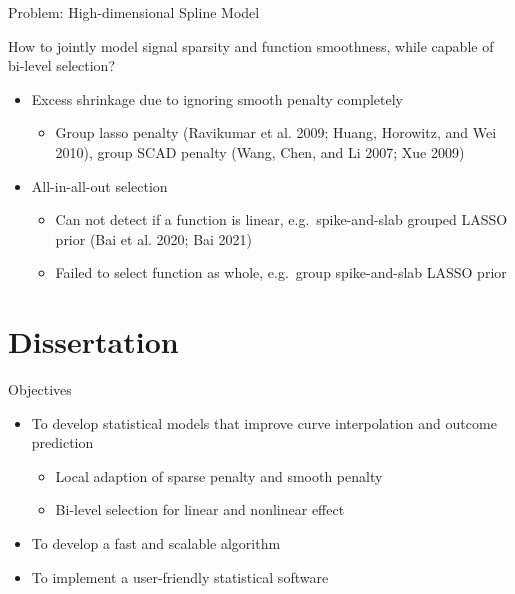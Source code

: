 \documentclass[
  ignorenonframetext,
  aspectratio=169]{beamer}
\providecommand{\tightlist}{%
  \setlength{\itemsep}{0pt}\setlength{\parskip}{0pt}}
\begin{document}
\begin{frame}{Problem: High-dimensional Spline Model}
\protect\hypertarget{problem-high-dimensional-spline-model}{}
\begin{tcolorbox}[colback=green!5,colframe=green!40!black,title=Question]
How to jointly model signal sparsity and function smoothness, while capable of bi-level selection?
\end{tcolorbox}

\begin{itemize}
\tightlist
\item
  Excess shrinkage due to ignoring smooth penalty completely

  \begin{itemize}
  \tightlist
  \item
    Group lasso penalty (Ravikumar et al. 2009; Huang, Horowitz, and Wei
    2010), group SCAD penalty (Wang, Chen, and Li 2007; Xue 2009)
  \end{itemize}
\item
  All-in-all-out selection

  \begin{itemize}
  \tightlist
  \item
    Can not detect if a function is linear, e.g.~spike-and-slab grouped
    LASSO prior (Bai et al. 2020; Bai 2021)
  \item
    Failed to select function as whole, e.g.~group spike-and-slab LASSO
    prior
  \end{itemize}
\end{itemize}
\end{frame}

\hypertarget{dissertation}{%
\section{Dissertation}\label{dissertation}}

\begin{frame}{Objectives}
\protect\hypertarget{objectives}{}
\begin{itemize}
\tightlist
\item
  To develop statistical models that improve curve interpolation and
  outcome prediction

  \begin{itemize}
  \tightlist
  \item
    Local adaption of sparse penalty and smooth penalty
  \item
    Bi-level selection for linear and nonlinear effect
  \end{itemize}
\item
  To develop a fast and scalable algorithm
\item
  To implement a user-friendly statistical software
\end{itemize}
\end{frame}
\end{document}
